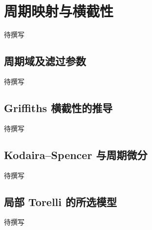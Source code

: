 
% 
% 

\section{周期映射与横截性}
\label{g4:sec:3203}

待撰写

\subsection{周期域及滤过参数}
\label{g4:subsec:3203:01}
待撰写

\subsection{Griffiths 横截性的推导}
\label{g4:subsec:3203:02}
待撰写

\subsection{Kodaira–Spencer 与周期微分}
\label{g4:subsec:3203:03}
待撰写

\subsection{局部 Torelli 的所选模型}
\label{g4:subsec:3203:04}
待撰写
